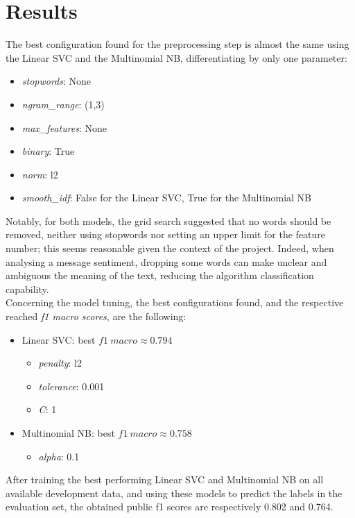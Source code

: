 \documentclass[conference]{IEEEtran}
\begin{document}
\section{Results}
The best configuration found for the preprocessing step is almost the same using the Linear SVC and the Multinomial NB, differentiating by only one parameter:
\begin{itemize}
    \item \textit{stopwords}: None 
    \item \textit{ngram\_range}: (1,3)
    \item \textit{max\_features}: None
    \item \textit{binary}: True
    \item \textit{norm}: l2
    \item \textit{smooth\_idf}: False for the Linear SVC, True for the Multinomial NB
\end{itemize}
Notably, for both models, the grid search suggested that no words should be removed, neither using stopwords nor setting an upper limit for the feature number; this seems reasonable given the context of the project. Indeed, when analysing a message sentiment, dropping some words can make unclear and ambiguous the meaning of the text, reducing the algorithm classification capability.\\
Concerning the model tuning, the best configurations found, and the respective reached \textit{f1 macro scores}, are the following:
\begin{itemize}
    \item Linear SVC: best $f1\:macro \approx 0.794$
    \begin{itemize}
        \item \textit{penalty}: l2
        \item \textit{tolerance}: 0.001
        \item \textit{C}: 1
    \end{itemize}
    \item Multinomial NB: best $f1\:macro \approx 0.758$
    \begin{itemize}
        \item \textit{alpha}: 0.1
    \end{itemize}
\end{itemize}
After training the best performing Linear SVC and Multinomial NB on all available development data, and using these models to predict the labels in the evaluation set, the obtained public f1 scores are respectively 0.802 and 0.764. \\
\end{document}
